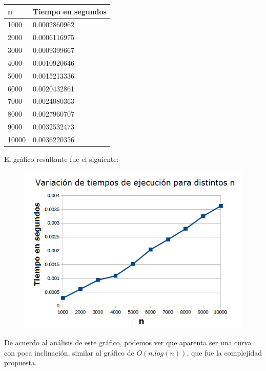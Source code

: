 \begin{table}[htb]
\centering
\begin{tabular}[c]{|l|l|}

		\hline
n & Tiempo en segundos\\
		\hline
1000	&	0.0002860962\\
		\hline
2000	&	0.0006116975\\
		\hline
3000	&	0.0009399667\\
		\hline
4000	&	0.0010920646\\
		\hline
5000	&	0.0015213336\\
		\hline
6000	&	0.0020432861\\
		\hline
7000	&	0.0024080363\\
		\hline
8000	&	0.0027960707\\
		\hline
9000	&	0.0032532473\\
		\hline
10000	&	0.0036220356\\
		\hline
		
	\end{tabular}
\end{table}

El gr\'afico resultante fue el siguiente:

 \begin{figure}[h!]
   \begin{center}
 	\includegraphics[scale=0.8]{imagenes/ej1/Mediciones/Grafico1.png}
   \end{center}
 \end{figure}

De acuerdo al an\'alisis de este gr\'afico, podemos ver que aparenta ser una curva con poca inclinaci\'on, similar al gr\'afico de $O( n.log(n) )$, que fue la complejidad propuesta.\\

